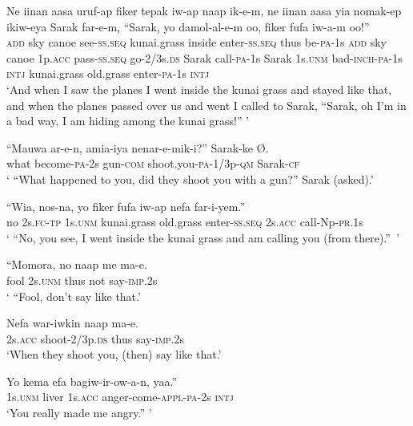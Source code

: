 \ea
\gll  Ne  iinan  aasa  uruf-ap  fiker  tepak  iw-ap naap  ik-e-m,  ne  iinan  aasa  yia  nomak-ep ikiw-eya  Sarak  far-e-m,  “Sarak,  yo  damol-al-e-m oo,  fiker  fufa  iw-a-m  oo!” \\
\textsc{add}  sky  canoe  see-\textsc{ss.seq}  kunai.grass  inside  enter-\textsc{ss.seq} thus  be-\textsc{pa}-1s  \textsc{add}  sky  canoe  1p.\textsc{acc}  pass-\textsc{ss.seq} go-2/3s.\textsc{ds}  Sarak  call-\textsc{pa}-1s  Sarak  1s.\textsc{unm}  bad-\textsc{inch}-\textsc{pa}-1s \textsc{intj}  kunai.grass  old.grass  enter-\textsc{pa}-1s  \textsc{intj} \\ 
\glt ‘And when I saw the planes I went inside the kunai grass and stayed like that, and when the planes passed over us and went I called to Sarak, “Sarak, oh I'm in a bad way, I am hiding among the kunai grass!” ’ \\
\z


\ea
\gll  “Mauwa  ar-e-n,  amia-iya  nenar-e-mik-i?”  Sarak-ke  Ø. \\
what  become-\textsc{pa}-2s  gun-\textsc{com}  shoot.you-\textsc{pa}-1/3p-\textsc{qm} Sarak-\textsc{cf} \\ 
\glt ‘ “What happened to you, did they shoot you with a gun?” Sarak (asked).’ \\
\z


\ea
\gll  “Wia,  nos-na,  yo  fiker  fufa  iw-ap nefa  far-i-yem.” \\
no  2s.\textsc{fc}-\textsc{tp}  1s.\textsc{unm}  kunai.grass  old.grass  enter-\textsc{ss.seq} 2s.\textsc{acc}  call-Np-\textsc{pr}.1s \\
\glt ‘ “No, you see, I went inside the kunai grass and am calling you (from there).”~’ \\
\z


\ea
\gll  “Momora,  no  naap  me  ma-e. \\
fool  2s.\textsc{unm}  thus  not  say-\textsc{imp}.2s \\
\glt ‘ “Fool, don’t say like that.’ \\
\z


\ea
\gll  Nefa  war-iwkin  naap  ma-e. \\
2s.\textsc{acc}  shoot-2/3p.\textsc{ds}  thus  say-\textsc{imp}.2s \\
\glt ‘When they shoot you, (then) say like that.’ \\
\z


\ea
\gll  Yo  kema  efa  bagiw-ir-ow-a-n,  yaa.” \\
1s.\textsc{unm}  liver  1s.\textsc{acc}  anger-come-\textsc{appl}-\textsc{pa}-2s  \textsc{intj} \\
\glt ‘You really made me angry.” ’ \\
\z


